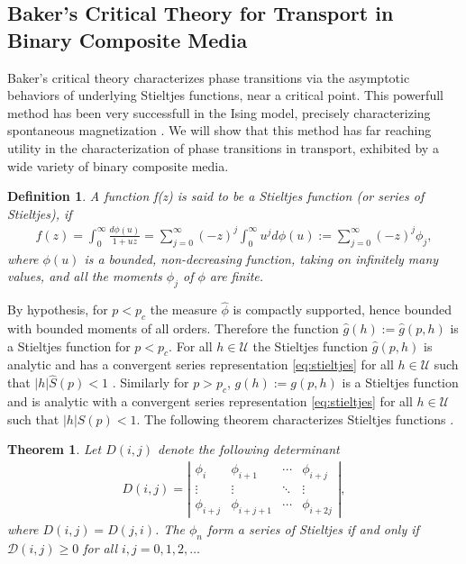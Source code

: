 \documentclass[english,12pt]{ttuthes}
\newtheorem{theorem}{Theorem}[chapter]
\newtheorem{definition}{Definition}[chapter]
\newcommand{\ph}{\hat{\phi}}
\begin{document}
\subsection{Baker's Critical Theory for Transport in Binary Composite
  Media}
%
Baker's critical theory characterizes phase transitions via the
asymptotic behaviors of underlying Stieltjes functions, near a critical 
point. This powerfull method has been very successfull in the Ising
model, precisely characterizing spontaneous magnetization
\cite{Baker-1990}. We will show that this method has far reaching
utility in the characterization of phase transitions in transport,
exhibited by a wide variety of binary composite media.   
%
\begin{definition}  \label{def:stieltjes}
  A function f(z) is said to be a \emph{Stieltjes function} (or
  \emph{series of Stieltjes}), if 
  \begin{align} \label{eq:stieltjes}
    f(z)=\int_0^\infty\frac{d\phi(u)}{1+uz}
    =\sum_{j =0}^\infty(-z)^j\int_0^\infty u^jd\phi(u)
    :=\sum_{j =0}^\infty(-z)^j\phi_j,
  \end{align}
  where $\phi(u)$ is a bounded, non-decreasing function, taking on
  infinitely many values, and all the moments $\phi_j$ of $\phi$ are
  finite.  
\end{definition}
%
By hypothesis, for $p<p_c$ the measure $\ph$ is compactly supported,
hence bounded with bounded moments of all orders. Therefore the
function $\hat{g}(h):=\hat{g}(p,h)$ is a Stieltjes function for
$p<p_c$. For all $h\in\mathcal{U}$ the Stieltjes function $\hat{g}(p,h)$
is analytic and has a convergent series representation
\eqref{eq:stieltjes} for all $h\in\mathcal{U}$ such that
$|h|\hat{S}(p)<1$ \cite{Golden:PRL-3935,Golden:CMP-473}. Similarly for
$p>p_c$, $g(h):=g(p,h)$ is a Stieltjes function and is analytic
with a convergent series representation \eqref{eq:stieltjes} for all
$h\in\mathcal{U}$ such that $|h|S(p)<1$. The following theorem
characterizes Stieltjes functions \cite{Baker-1990}.  
% 
\begin{theorem} \label{thm:stieltjes_Characterization}
   Let $D(i,j)$ denote the following determinant
    \begin{align} \label{eq:Detf} 
     D(i,j) = \left|
                 \begin{matrix}
                   \phi_i&\phi_{i+1}&\cdots&\phi_{i+j}\\ 
                   \vdots&\vdots&\ddots&\vdots\\
                   \phi_{i+j}&\phi_{i+j+1}&\cdots&\phi_{i+2j}                            
                   \end{matrix}
              \right| ,    
   \end{align}
   where $D(i,j)=D(j,i)$. The $\phi_n$ form a series of Stieltjes if and
   only if $\mathcal{D}(i,j) \geq 0$ for all $i,j =0,1,2,\ldots$

 \end{theorem}
\end{document}
